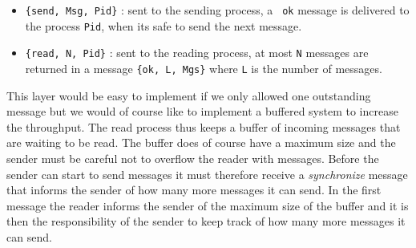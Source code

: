 \documentclass[a4paper,11pt]{article}
\begin{document}
\begin{itemize}
\item {\tt \{send, Msg, Pid\}} : sent to the sending process, a {\tt
    ok} message is delivered to the process {\tt Pid}, when its safe
  to send the next message.

\item {\tt \{read, N, Pid\}} : sent to the reading process, at most
  {\tt N} messages are returned in a message {\tt \{ok, L, Mgs\}}
  where {\tt L} is the number of messages.
\end{itemize}

This layer would be easy to implement if we only allowed one
outstanding message but we would of course like to implement a
buffered system to increase the throughput. The read process thus keeps
a buffer of incoming messages that are waiting to be read. The buffer
does of course have a maximum size and the sender must be careful not
to overflow the reader with messages. Before the sender can start to
send messages it must therefore receive a {\em synchronize} message
that informs the sender of how many more messages it can send. In the
first message the reader informs the sender of the maximum size of the
buffer and it is then the responsibility of the sender to keep track of
how many more messages it can send.
\end{document}
